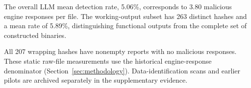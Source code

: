 The overall LLM mean detection rate, 5.06\%, corresponds to 3.80 malicious
engine responses per file. The working-output subset has 263 distinct
hashes and a mean rate of 5.89\%, distinguishing functional outputs from
the complete set of constructed binaries.

All 207 wrapping hashes have nonempty reports with no malicious responses.
These static raw-file measurements use the historical engine-response
denominator (Section~\ref{sec:methodology}). Data-identification scans and
earlier pilots are archived separately in the supplementary evidence.

